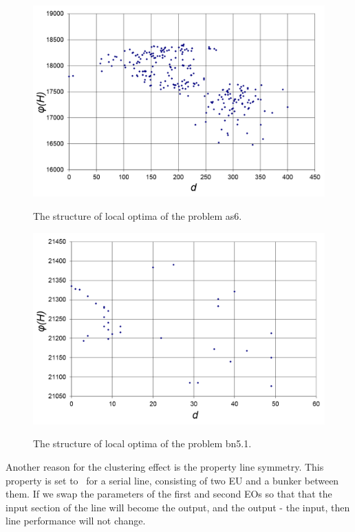 \documentclass{ifacconf}
\begin{document}
\begin{figure}[h!]
	\begin{center}
		\includegraphics[scale=0.2]{klaster_as4.png}\\
		\caption{The structure of local optima of the problem as6.} \label{klaster_as4}
	\end{center}
\end{figure} 
\begin{figure}[h!]
	\begin{center}
		\includegraphics[scale=0.2]{klaster_bn5_1.png}\\
		\caption{The structure of local optima of the problem bn5.1.} \label{klaster_bn5_1}
	\end{center}
\end{figure} 

Another reason for the clustering effect is the property
line symmetry. This property is set to~\cite{LP} for a serial line,
consisting of two EU and a bunker
between them. If we swap the parameters of the first and second EOs so that
that the input section of the line will become the output, and the output - the input, then
line performance will not change.
\end{document}

